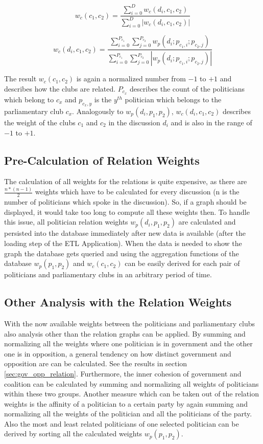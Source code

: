 $$
w_c(c_1,c_2) = \frac{\displaystyle\sum_{i=0}^{D} w_c(d_i,c_1,c_2)}{\displaystyle\sum_{i=0}^{D} |w_c(d_i,c_1,c_2)|}
$$

$$
w_c(d_i,c_1,c_2) = \frac{\displaystyle\sum_{i=0}^{P_{c_1}} \displaystyle\sum_{j=0}^{P_{c_2}} w_p(d_i;p_{c_1,i};p_{c_2,j})}{\displaystyle\sum_{i=0}^{P_{c_1}} \displaystyle\sum_{j=0}^{P_{c_2}} |w_p(d_i;p_{c_1,i};p_{c_2,j})|}
$$

The result $w_c(c_1,c_2)$ is again a normalized number from $-1$ to $+1$ and describes how the clubs are related. $P_{c_x}$ describes the count of the politicians which belong to $c_x$ and $p_{c_x,y}$ is the $y^{th}$ politician which belongs to the parliamentary club $c_x$. Analogously to $w_p(d_i,p_1,p_2)$, $w_c(d_i,c_1,c_2)$ describes the weight of the clubs $c_1$ and $c_2$ in the discussion $d_i$ and is also in the range of $-1$ to $+1$.

\subsection{Pre-Calculation of Relation Weights}
The calculation of all weights for the relations is quite expensive, as there are $\frac{n * (n - 1)}{2}$ weights which have to be calculated for every discussion (n is the number of politicians which spoke in the discussion). So, if a graph should be displayed, it would take too long to compute all these weights then. To handle this issue, all politician relation weights $w_p(d_i,p_1,p_2)$ are calculated and persisted into the database immediately after new data is available (after the loading step of the ETL Application). When the data is needed to show the graph the database gets queried and using the aggregation functions of the database $w_p(p_1,p_2)$ and $w_c(c_1,c_2)$ can be easily derived for each pair of politicians and parliamentary clubs in an arbitrary period of time.

\subsection{Other Analysis with the Relation Weights}
With the now available weights between the politicians and parliamentary clubs also analysis other than the relation graphs can be applied. By summing and normalizing all the weights where one politician is in government and the other one is in opposition, a general tendency on how distinct government and opposition are can be calculated. See the results in section \ref{sec:gov_opp_relation}.
Furthermore, the inner cohesion of government and coalition can be calculated by summing and normalizing all weights of politicians within these two groups. Another measure which can be taken out of the relation weights is the affinity of a politician to a certain party by again summing and normalizing all the weights of the politician and all the politicians of the party. Also the most and least related politicians of one selected politician can be derived by sorting all the calculated weights $w_p(p_1,p_2)$.

